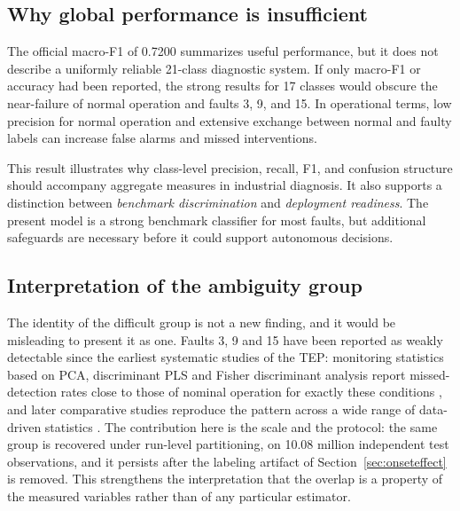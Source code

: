 \documentclass[10pt,twocolumn,a4paper]{article}
\begin{document}
\subsection{Why global performance is insufficient}

The official macro-F1 of 0.7200 summarizes useful performance, but it does not
describe a uniformly reliable 21-class diagnostic system. If only macro-F1 or
accuracy had been reported, the strong results for 17 classes would obscure
the near-failure of normal operation and faults 3, 9, and 15. In operational
terms, low precision for normal operation and extensive exchange between normal
and faulty labels can increase false alarms and missed interventions.

This result illustrates why class-level precision, recall, F1, and confusion
structure should accompany aggregate measures in industrial diagnosis. It also
supports a distinction between \emph{benchmark discrimination} and
\emph{deployment readiness}. The present model is a strong benchmark
classifier for most faults, but additional safeguards are necessary before it
could support autonomous decisions.

\subsection{Interpretation of the ambiguity group}

The identity of the difficult group is not a new finding, and it would be
misleading to present it as one. Faults 3, 9 and 15 have been reported as
weakly detectable since the earliest systematic studies of the TEP: monitoring
statistics based on PCA, discriminant PLS and Fisher discriminant analysis
report missed-detection rates close to those of nominal operation for exactly
these conditions \cite{chiang2000discriminant,chiang2001book}, and later
comparative studies reproduce the pattern across a wide range of data-driven
statistics \cite{yin2012comparison}. The contribution here is the scale and the
protocol: the same group is recovered under run-level partitioning, on 10.08
million independent test observations, and it persists after the labeling
artifact of Section~\ref{sec:onseteffect} is removed. This strengthens the
interpretation that the overlap is a property of the measured variables rather
than of any particular estimator.
\end{document}
